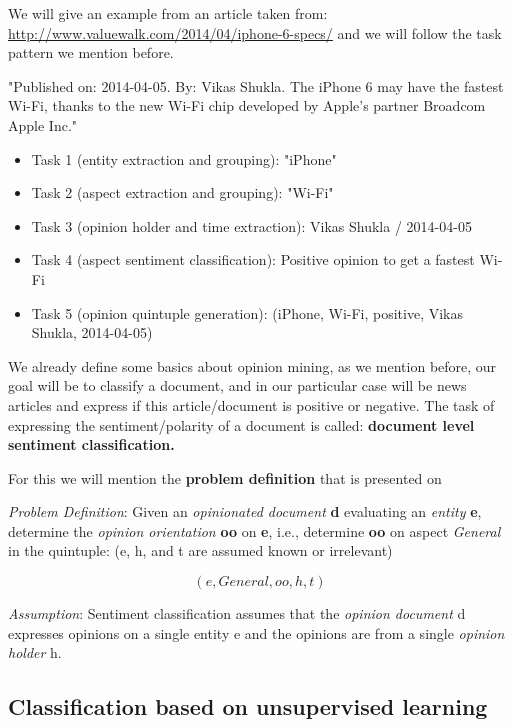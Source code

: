 We will give an example from an article taken from: \url{http://www.valuewalk.com/2014/04/iphone-6-specs/} and we will follow the task pattern we mention before.

"Published on: 2014-04-05. By: Vikas Shukla. The iPhone 6 may have the fastest Wi-Fi, thanks to the new Wi-Fi chip developed by Apple's partner Broadcom Apple Inc."

\begin{itemize}
	\item Task 1 (entity extraction and grouping): "iPhone"
	\item Task 2 (aspect extraction and grouping): "Wi-Fi"
	\item Task 3 (opinion holder and time extraction): Vikas Shukla / 2014-04-05
	\item Task 4 (aspect sentiment classification): Positive opinion to get a fastest Wi-Fi
	\item Task 5 (opinion quintuple generation): (iPhone, Wi-Fi, positive, Vikas Shukla, 2014-04-05)
\end{itemize}

We already define some basics about opinion mining, as we mention before, our goal will be to classify a  document, and in our particular case will be news articles and express if this article/document is positive or negative. The task of expressing the sentiment/polarity of a document is called: \textbf{document level sentiment classification.} 

For this we will mention the \textbf{problem definition} that is presented on %

\emph{Problem Definition}: Given an \emph{opinionated document} \textbf{d} evaluating an \emph{entity} \textbf{e}, determine the \emph{opinion orientation} \textbf{oo} on \textbf{e}, i.e., determine \textbf{oo} on aspect \emph{General} in the quintuple: (e, h, and t are assumed known or irrelevant)

\begin{equation} \label{eq:documentClassificationProblem}
	(e, General, oo, h, t)
\end{equation}

\emph{Assumption}: Sentiment classification assumes that the \emph{opinion document} d expresses opinions on a single entity e and the opinions are from a single \emph{opinion holder} h.

\subsection{Classification based on unsupervised learning}\label{unsupervisedLearning}

